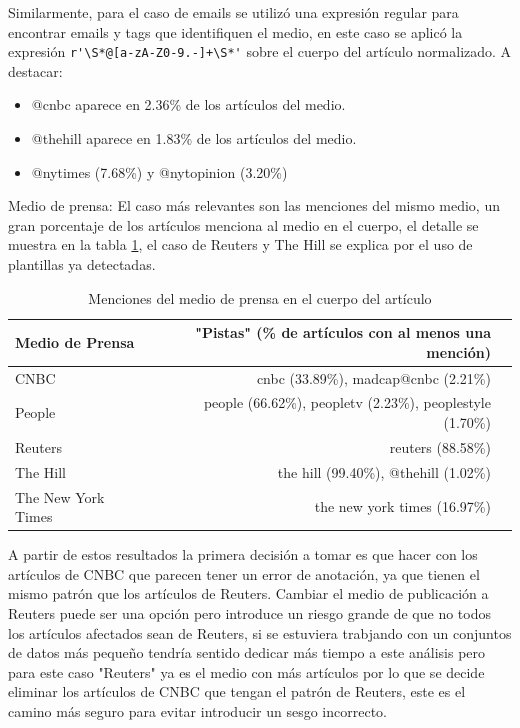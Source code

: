 \documentclass[11pt, a4paper]{article}
\begin{document}
Similarmente, para el caso de emails se utilizó una expresión regular para encontrar emails
 y tags que identifiquen el medio, en este caso se aplicó la expresión
  \verb|r'\S*@[a-zA-Z0-9.-]+\S*'| sobre el cuerpo del artículo normalizado. A destacar:
  \begin{itemize}
  \item @cnbc aparece en 2.36\% de los artículos del medio.
  \item @thehill aparece en 1.83\% de los artículos del medio.
  \item @nytimes (7.68\%) y @nytopinion (3.20\%)
  \end{itemize}

Medio de prensa: El caso más relevantes son las menciones del mismo medio, 
un gran porcentaje de los artículos menciona al medio en el cuerpo, el detalle
se muestra en la tabla \ref{tab:pistas_medios}, el caso de Reuters y The Hill 
se explica por el uso de plantillas ya detectadas.

\begin{table}[hbt!]
    \centering
    \caption{Menciones del medio de prensa en el cuerpo del artículo}
    \label{tab:pistas_medios}
    \begin{tabular}{lrl}
        \toprule
        \textbf{Medio de Prensa} & \textbf{ "Pistas" (\% de artículos con al menos una mención)} \\
        \midrule
        CNBC & cnbc (33.89\%), madcap@cnbc (2.21\%) \\
        People & people (66.62\%), peopletv (2.23\%), peoplestyle (1.70\%) \\
        Reuters & reuters (88.58\%) \\
        The Hill & the hill (99.40\%), @thehill (1.02\%) \\
        The New York Times & the new york times (16.97\%) \\
        \bottomrule
    \end{tabular}
\end{table}


A partir de estos resultados la primera decisión a tomar es que hacer con los artículos de CNBC
que parecen tener un error de anotación, ya que tienen el mismo patrón que los artículos de Reuters.
Cambiar el medio de publicación a Reuters puede ser una opción pero introduce un riesgo grande
de que no todos los artículos afectados sean de Reuters, si se estuviera trabjando con un 
conjuntos de datos más pequeño tendría sentido dedicar más tiempo a este análisis pero para 
este caso "Reuters" ya es el medio con más artículos por lo que se decide eliminar los artículos de
CNBC que tengan el patrón de Reuters, este es el camino más seguro para evitar introducir un sesgo 
incorrecto.
\end{document}
